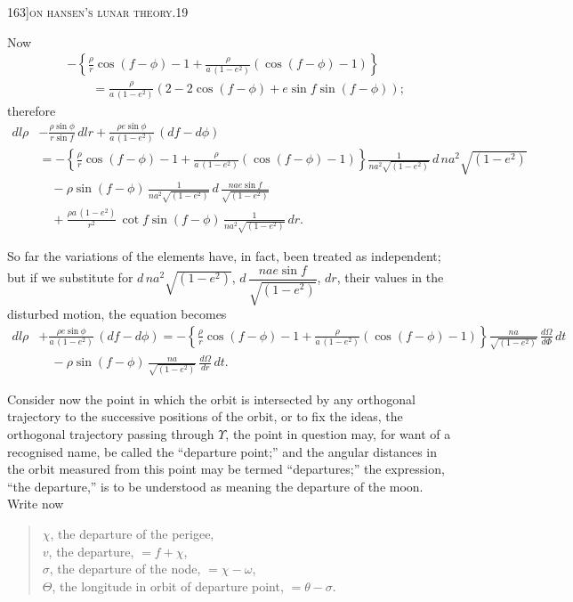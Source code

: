 \documentclass[11pt]{article}
\begin{document}
\newpage

\begin{center}
\small 163]\hfill\textsc{on hansen's lunar theory.}\hfill\textsc{19}
\end{center}

\medskip

\noindent Now
\begin{align*}
&-\left\{\frac{\rho}{r}\cos(f - \phi) - 1 + \frac{\rho}{a\,(1-e^{2})}\!\left(\cos(f - \phi) - 1\right)\right\}\\
&\qquad = \frac{\rho}{a\,(1-e^{2})}\!\left(2 - 2\cos(f - \phi) + e\sin f\sin(f - \phi)\right);
\end{align*}
therefore
\[
\begin{aligned}
dl\rho &- \frac{\rho\sin\phi}{r\sin f}\,dlr + \frac{\rho e\sin\phi}{a\,(1-e^{2})}\,(df - d\phi)\\
&= -\left\{\frac{\rho}{r}\cos(f - \phi) - 1 + \frac{\rho}{a\,(1-e^{2})}\!\left(\cos(f - \phi) - 1\right)\right\}\frac{1}{na^{2}\sqrt{(1-e^{2})}}\,d\,na^{2}\sqrt{(1-e^{2})}\\
&\quad - \rho\sin(f - \phi)\,\frac{1}{na^{2}\sqrt{(1-e^{2})}}\,d\,\frac{nae\sin f}{\sqrt{(1-e^{2})}}\\
&\quad + \frac{\rho a\,(1-e^{2})}{r^{2}}\,\cot f\sin(f - \phi)\,\frac{1}{na^{2}\sqrt{(1-e^{2})}}\,dr.
\end{aligned}
\]

So far the variations of the elements have, in fact, been treated as independent;
but if we substitute for $d\,na^{2}\sqrt{(1-e^{2})}$, $d\,\dfrac{nae\sin f}{\sqrt{(1-e^{2})}}$, $dr$, their values in the disturbed
motion, the equation becomes
\[
\begin{aligned}
dl\rho &+ \frac{\rho e\sin\phi}{a\,(1-e^{2})}\,(df - d\phi) = -\left\{\frac{\rho}{r}\cos(f - \phi) - 1 + \frac{\rho}{a\,(1-e^{2})}\!\left(\cos(f - \phi) - 1\right)\right\}\frac{na}{\sqrt{(1-e^{2})}}\,\frac{d\Omega}{d\Phi}\,dt\\
&\quad - \rho\sin(f - \phi)\,\frac{na}{\sqrt{(1-e^{2})}}\,\frac{d\Omega}{dr}\,dt.
\end{aligned}
\]

Consider now the point in which the orbit is intersected by any orthogonal
trajectory to the successive positions of the orbit, or to fix the ideas, the orthogonal
trajectory passing through $\Upsilon$, the point in question may, for want of a recognised
name, be called the ``departure point;'' and the angular distances in the orbit measured
from this point may be termed ``departures;'' the expression, ``the departure,'' is to be
understood as meaning the departure of the moon. Write now
\begin{quote}
$\chi$, the departure of the perigee,\\
$v$, the departure, $= f + \chi$,\\
$\sigma$, the departure of the node, $= \chi - \omega$,\\
$\Theta$, the longitude in orbit of departure point, $= \theta - \sigma$.
\end{quote}
\end{document}
